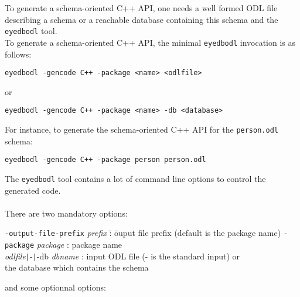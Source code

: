 To generate a schema-oriented C++ API, one needs a well formed ODL
file describing a schema or a reachable database containing this schema
and the \texttt{eyedbodl} tool.
\\
To generate a schema-oriented C++ API, the minimal \texttt{eyedbodl} invocation
is as follows:
\begin{verbatim}
eyedbodl -gencode C++ -package <name> <odlfile>
\end{verbatim}
or
\begin{verbatim}
eyedbodl -gencode C++ -package <name> -db <database>
\end{verbatim}
For instance, to generate the schema-oriented C++ API for the \texttt{person.odl}
schema:
\begin{verbatim}
eyedbodl -gencode C++ -package person person.odl
\end{verbatim}
The \texttt{eyedbodl} tool contains a lot of command line options to
control the generated code.
\\
\\
There are two mandatory options:
\begin{tabbing}
\texttt{-output-file-prefix} \emph{prefix} \= : \= ouput file prefix (default is the package name)\kill
\texttt{-package} \emph{package}     \> : \> package name\\
\emph{odlfile}\texttt{|}-\texttt{|}-db \emph{dbname}    \> : \> input ODL file (- is the standard input) or\\
\>                          \> the database which contains the schema \\
\end{tabbing}
and some optionnal options:
